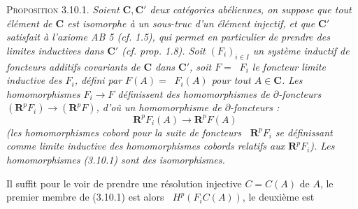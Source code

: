 \textsc{Proposition 3.10.1.} \textit{Soient $\mathbf C,\mathbf C'$ deux
catégories abéliennes, on suppose que tout élément de $\mathbf C$ est
isomorphe à un sous-truc d'un élément injectif, et que $\mathbf C'$ satisfait
à l'axiome \textup{AB 5 (}cf. \textup{1.5)}, qui permet en particulier de prendre des limites
inductives dans $\mathbf C'$ \textup{(}cf. prop. \textup{1.8)}. Soit $(F_i)_{i\in I}$ un
système inductif de foncteurs additifs covariants de $\mathbf C$ dans
$\mathbf C'$, soit $F=\mathop{\underset{\to}{\lim}} F_i$ le foncteur limite inductive des $F_i$,
défini par $F(A)=\mathop{\underset{\to}{\lim}} F_i(A)$ pour tout $A\in\mathbf C$. Les
homomorphismes $F_i\to F$ définissent des homomorphismes de
$\partial$-foncteurs $(\mathbf R^pF_i)\to(\mathbf R^pF)$, d'oû
un homomorphisme de $\partial$-foncteurs :}
\[
\tag{3.10.1.}
\mathop{\underset{\to}{\lim}} \mathbf R^pF_i(A)\to \mathbf R^pF(A)
\]
\textit{\textup{(}les homomorphismes cobord pour la suite de foncteurs
$\mathop{\underset{\to}{\lim}}\mathbf R^pF_i$ se définissant comme limite inductive des
homomorphismes cobords relatifs aux $\mathbf R^pF_i$\textup{)}. Les homomorphismes
\textup{(3.10.1)} sont des isomorphismes.}

Il suffit pour le voir de prendre une résolution injective
$C=C(A)$ de $A$, le premier membre de (3.10.1) est alors
$\mathop{\underset{\to}{\lim}} H^p(F_iC(A))$, le deuxième est

